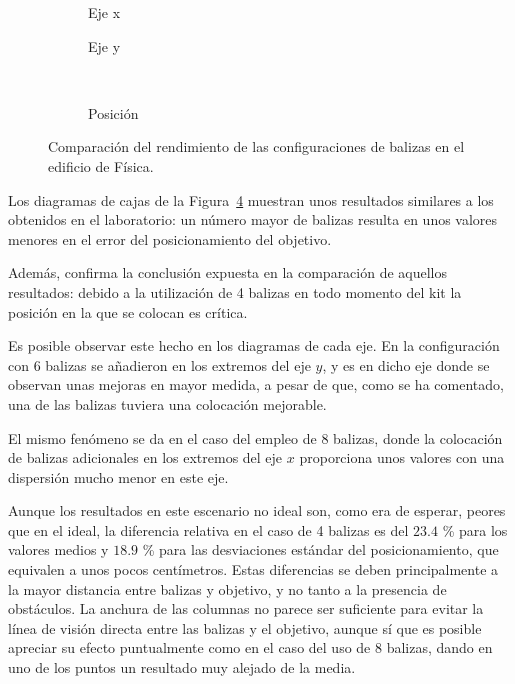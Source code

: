 \begin{figure}[H]
  \centering
    \begin{subfigure}[b]{.3\textwidth}
      \centering
      \hspace*{-0.8cm}
       
      \caption{Eje x}
      \label{fig:boxplot_fisica_x}
    \end{subfigure}
    \hspace*{0.1cm}
    \begin{subfigure}[b]{.3\textwidth}
      \centering
        
      \caption{Eje y}
      \label{fig:boxplot_fisica_y}
    \end{subfigure}
    ~~~~
    \begin{subfigure}[b]{.3\textwidth}
        \centering
          
        \caption{Posición}
        \label{fig:boxplot_fisica_pos}
      \end{subfigure}
    \caption{Comparación del rendimiento de las configuraciones de balizas en el edificio de Física.}
    \label{fig:boxplot_fisica}
\end{figure}

Los diagramas de cajas de la Figura~\ref{fig:boxplot_fisica} muestran unos resultados similares a los obtenidos en el laboratorio: un número mayor de balizas resulta en unos valores menores en el error del posicionamiento del objetivo.

Además, confirma la conclusión expuesta en la comparación de aquellos resultados: debido a la utilización de 4 balizas en todo momento del kit la posición en la que se colocan es crítica.

Es posible observar este hecho en los diagramas de cada eje.
En la configuración con 6 balizas se añadieron en los extremos del eje $y$, y es en dicho eje donde se observan unas mejoras en mayor medida, a pesar de que, como se ha comentado, una de las balizas tuviera una colocación mejorable.

El mismo fenómeno se da en el caso del empleo de 8 balizas, donde la colocación de balizas adicionales en los extremos del eje $x$ proporciona unos valores con una dispersión mucho menor en este eje.

Aunque los resultados en este escenario no ideal son, como era de esperar, peores que en el ideal, la diferencia relativa en el caso de 4 balizas es del $23.4$ \% para los valores medios y $18.9$ \% para las desviaciones estándar del posicionamiento, que equivalen a unos pocos centímetros.
Estas diferencias se deben principalmente a la mayor distancia entre balizas y objetivo, y no tanto a la presencia de obstáculos.
La anchura de las columnas no parece ser suficiente para evitar la línea de visión directa entre las balizas y el objetivo, aunque sí que es posible apreciar su efecto puntualmente como en el caso del uso de 8 balizas, dando en uno de los puntos un resultado muy alejado de la media.

